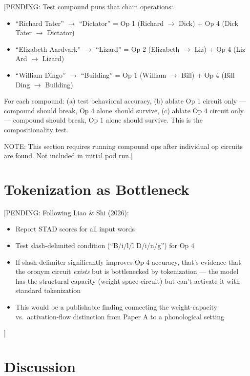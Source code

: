 \documentclass{article}
\newcommand{\PENDING}[1]{{\color{blue}[PENDING: #1]}}
\begin{document}
\PENDING{Test compound puns that chain operations:
\begin{itemize}
  \item ``Richard Tater'' $\to$ ``Dictator'' = Op 1 (Richard $\to$ Dick) + Op 4 (Dick Tater $\to$ Dictator)
  \item ``Elizabeth Aardvark'' $\to$ ``Lizard'' = Op 2 (Elizabeth $\to$ Liz) + Op 4 (Liz Ard $\to$ Lizard)
  \item ``William Dingo'' $\to$ ``Building'' = Op 1 (William $\to$ Bill) + Op 4 (Bill Ding $\to$ Building)
\end{itemize}

For each compound: (a) test behavioral accuracy, (b) ablate Op 1 circuit only
--- compound should break, Op 4 alone should survive, (c) ablate Op 4 circuit
only --- compound should break, Op 1 alone should survive. This is the
compositionality test.

NOTE: This section requires running compound ops after individual op circuits
are found. Not included in initial pod run.}

\section{Tokenization as Bottleneck}

\PENDING{Following Liao \& Shi (2026):
\begin{itemize}
  \item Report STAD scores for all input words
  \item Test slash-delimited condition (``B/i/l/l D/i/n/g'') for Op 4
  \item If slash-delimiter significantly improves Op 4 accuracy, that's
  evidence that the oronym circuit \emph{exists} but is bottlenecked by
  tokenization --- the model has the structural capacity (weight-space
  circuit) but can't activate it with standard tokenization
  \item This would be a publishable finding connecting the weight-capacity
  vs.\ activation-flow distinction from Paper A to a phonological setting
\end{itemize}}

\section{Discussion}
\end{document}
